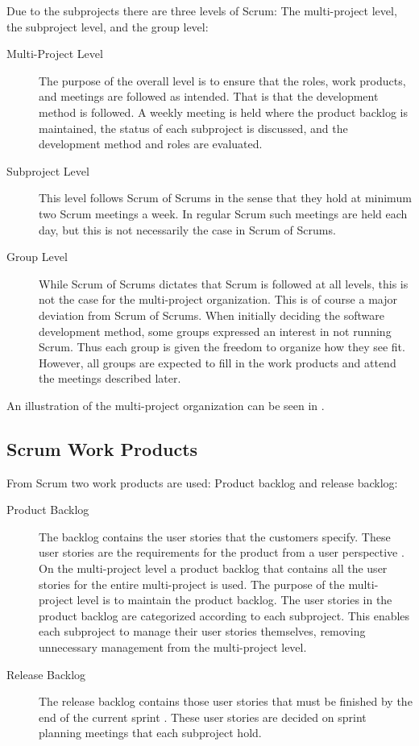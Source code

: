 Due to the subprojects there are three levels of Scrum: The multi-project level, the subproject level, and the group level:

\begin{description}
  \item[Multi-Project Level] The purpose of the overall level is to ensure that the roles, work products, and meetings are followed as intended. That is that the development method is followed. A weekly meeting is held where the product backlog is maintained, the status of each subproject is discussed, and the development method and roles are evaluated.
  \item[Subproject Level] This level follows Scrum of Scrums in the sense that they hold at minimum two Scrum meetings a week. In regular Scrum such meetings are held each day, but this is not necessarily the case in Scrum of Scrums.
  \item[Group Level] While Scrum of Scrums dictates that Scrum is followed at all levels, this is not the case for the multi-project organization. This is of course a major deviation from Scrum of Scrums. When initially deciding the software development method, some groups expressed an interest in not running Scrum. Thus each group is given the freedom to organize how they see fit. However, all groups are expected to fill in the work products and attend the meetings described later.
\end{description}

An illustration of the multi-project organization can be seen in .


\subsection{Scrum Work Products}
From Scrum two work products are used: Product backlog and release backlog:

\begin{description}
  \item[Product Backlog] The backlog contains the user stories that the customers specify. These user stories are the requirements for the product from a user perspective \parencite{larman2003}. On the multi-project level a product backlog that contains all the user stories for the entire multi-project is used. The purpose of the multi-project level is to maintain the product backlog. The user stories in the product backlog are categorized according to each subproject. This enables each subproject to manage their user stories themselves, removing unnecessary management from the multi-project level.
  \item[Release Backlog] The release backlog contains those user stories that must be finished by the end of the current sprint \parencite{larman2003}. These user stories are decided on sprint planning meetings that each subproject hold.
\end{description}

